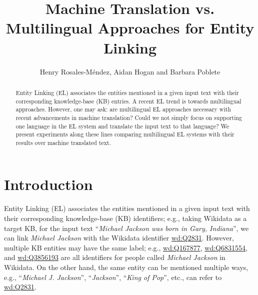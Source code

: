 \documentclass{llncs}
\begin{document}
\title{Machine Translation vs. Multilingual Approaches for Entity Linking}
%
%
\author{Henry Rosales-M\'endez, Aidan Hogan and Barbara Poblete}
%
%
%

\maketitle              %
\begin{abstract}
Entity Linking (EL) associates the entities mentioned in a given input text with their corresponding knowledge-base (KB) entries. A recent EL trend is towards multilingual approaches. However, one may ask: are multilingual EL approaches necessary with recent advancements in machine translation? Could we not simply focus on supporting one language in the EL system and translate the input text to that language? We present experiments along these lines comparing multilingual EL systems with their results over machine translated text.
\end{abstract}


\section{Introduction}
\label{sec:intro}

Entity Linking (EL) associates the entities mentioned in a given input text with their corresponding knowledge-base (KB) identifiers; e.g., taking Wikidata as a target KB, for the input text ``\textit{Michael Jackson was born in Gary, Indiana}'', we can link \textit{Michael Jackson} with the Wikidata identifier \url{wd:Q2831}. However, multiple KB entities may have the same label; e.g., \url{wd:Q167877}, \url{wd:Q6831554}, and \url{wd:Q3856193} are all identifiers for people called \textit{Michael Jackson} in Wikidata. On the other hand, the same entity can be mentioned multiple ways, e.g., ``\textit{Michael J. Jackson}'', ``\textit{Jackson}'', ``\textit{King of Pop}'', etc., can refer to \url{wd:Q2831}.
\end{document}
